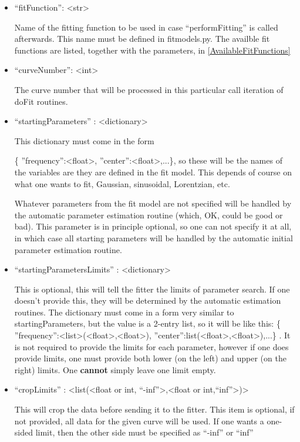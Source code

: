 \documentclass[11pt]{article} %
\begin{document}
\begin{tcolorbox}[breakable,title=Sending ``params'' to the server]
\begin{itemize}
\item ``fitFunction'': <str> 

Name of the fitting function to be used in case ``performFitting'' is called afterwards. This name must be defined in  { fitmodels.py}. The availble fit functions are listed, together with the parameters, in \ref{AvailableFitFunctions}

\item ``curveNumber'': <int> 

The curve number that will be processed in this particular call iteration of doFit routines.

\item ``startingParameters'' : <dictionary>

This dictionary must come in the form 

{ \{ {''}frequency{''}:<float>, {''}center{''}:<float>,...\}}, so these will be the names
of the variables are they are defined in the fit model. This depends of course on what one wants to fit, Gaussian, sinusoidal, Lorentzian, etc.

Whatever parameters from the fit model are not specified will be handled 
by the automatic parameter estimation routine (which, OK, could be good or bad). This parameter is in principle optional, so one can not specify it at all, in which case all starting parameters will be handled by the automatic initial parameter estimation routine.

\item ``startingParametersLimits'' : <dictionary> 

This is optional, this will tell the fitter the limits of parameter search. If one doesn't provide this, they will be determined by the automatic estimation routines. The dictionary must come in a form very similar to startingParameters, but the value is a 2-entry list, so it will be like this: 
{ \{ {''}frequency{''}:<list>(<float>,<float>), {''}center{''}:list(<float>,<float>),...\} } . 
It is not required to provide the limits for each parameter, however if one does provide limits, one must provide both lower (on the left) and upper (on the right) limits. One \textbf{cannot} simply leave one limit empty.

\item ``cropLimits'' : <list(<float or int, ``-inf''>,<float or int,``inf''>)> 

This will crop the data before sending it to the fitter. 
This item is optional, if not provided, all data for the given curve will be used. If one wants a one-sided limit, then the other side must be specified as ``-inf'' or ``inf''


\end{itemize}
\end{tcolorbox}
\end{document}
